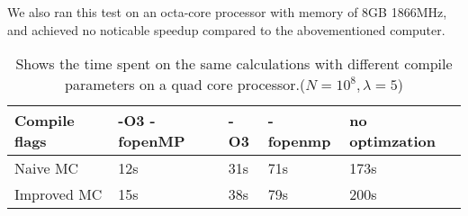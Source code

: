 \documentclass[../main.tex]{subfiles}
\begin{document}
We also ran this test on an octa-core processor with memory of 8GB 1866MHz, and achieved no noticable speedup compared to the abovementioned computer.
\begin{table}[!h]
    \begin{tabular}{ l | l l l l }

        Compile flags & -O3 -fopenMP \hspace{5mm} & -O3 \hspace{1cm} & -fopenmp\hspace{5mm} & no optimzation \\
        \hline
        Naive MC      & 12s          & 31s &    71s      & 173s           \\
        Improved MC   & 15s          & 38s &     79s     & 200s
    \end{tabular}
    \caption{Shows the time spent on the same calculations with different compile parameters on a quad core processor.($N = 10^8, \lambda = 5$)} \label{tab:res-paralell}
\end{table}
\end{document}

